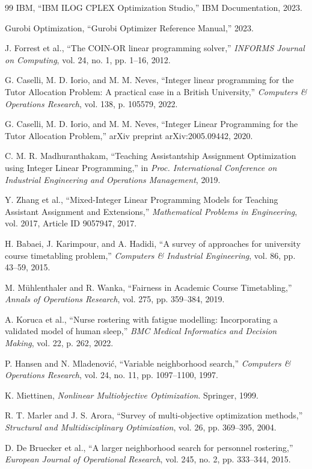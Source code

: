 \documentclass[journal,onecolumn]{IEEEtran}
\begin{document}
\begin{thebibliography}{99}
IBM, ``IBM ILOG CPLEX Optimization Studio,'' IBM Documentation, 2023.

Gurobi Optimization, ``Gurobi Optimizer Reference Manual,'' 2023.

J. Forrest et al., ``The COIN-OR linear programming solver,'' \textit{INFORMS Journal on Computing}, vol. 24, no. 1, pp. 1--16, 2012.

G. Caselli, M. D. Iorio, and M. M. Neves, ``Integer linear programming for the Tutor Allocation Problem: A practical case in a British University,'' \textit{Computers \& Operations Research}, vol. 138, p. 105579, 2022.

G. Caselli, M. D. Iorio, and M. M. Neves, ``Integer Linear Programming for the Tutor Allocation Problem,'' arXiv preprint arXiv:2005.09442, 2020.

C. M. R. Madhuranthakam, ``Teaching Assistantship Assignment Optimization using Integer Linear Programming,'' in \textit{Proc. International Conference on Industrial Engineering and Operations Management}, 2019.

Y. Zhang et al., ``Mixed-Integer Linear Programming Models for Teaching Assistant Assignment and Extensions,'' \textit{Mathematical Problems in Engineering}, vol. 2017, Article ID 9057947, 2017.

H. Babaei, J. Karimpour, and A. Hadidi, ``A survey of approaches for university course timetabling problem,'' \textit{Computers \& Industrial Engineering}, vol. 86, pp. 43--59, 2015.

M. Mühlenthaler and R. Wanka, ``Fairness in Academic Course Timetabling,'' \textit{Annals of Operations Research}, vol. 275, pp. 359--384, 2019.

A. Koruca et al., ``Nurse rostering with fatigue modelling: Incorporating a validated model of human sleep,'' \textit{BMC Medical Informatics and Decision Making}, vol. 22, p. 262, 2022.

P. Hansen and N. Mladenović, ``Variable neighborhood search,'' \textit{Computers \& Operations Research}, vol. 24, no. 11, pp. 1097--1100, 1997.

K. Miettinen, \textit{Nonlinear Multiobjective Optimization}. Springer, 1999.

R. T. Marler and J. S. Arora, ``Survey of multi-objective optimization methods,'' \textit{Structural and Multidisciplinary Optimization}, vol. 26, pp. 369--395, 2004.

D. De Bruecker et al., ``A larger neighborhood search for personnel rostering,'' \textit{European Journal of Operational Research}, vol. 245, no. 2, pp. 333--344, 2015.

\end{thebibliography}
\end{document}
